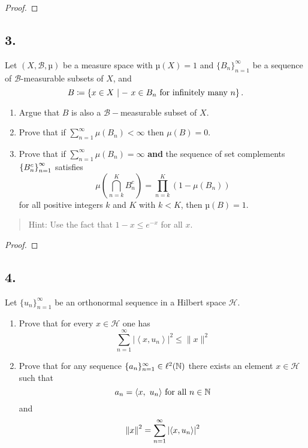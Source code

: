\begin{proof}

\end{proof}

\hypertarget{section-2}{%
\subsection{3.}\label{section-2}}

Let \((X, \mathcal B, µ)\) be a measure space with \(µ(X) = 1\) and
\(\{B_n\}_{n=1}^\infty\) be a sequence of \(\mathcal B\)-measurable
subsets of \(X\), and \[
B \coloneqq \left\{{x\in X {~\mid- ~} x\in B_n \text{ for infinitely many } n}\right\}.
\]

\begin{enumerate}
\def\labelenumi{\alph{enumi}.}
\item
  Argue that \(B\) is also a \(\mathcal{B} -\)measurable subset of
  \(X\).
\item
  Prove that if \(\sum_{n=1}^\infty \mu(B_n) < \infty\) then
  \(\mu(B)= 0\).
\item
  Prove that if \(\sum_{n=1}^\infty \mu(B_n) = \infty\) \textbf{and} the
  sequence of set complements \(\left\{{B_n^c}\right\}_{n=1}^\infty\) satisfies
  \[
  \mu\left(\bigcap_{n=k}^{K} B_{n}^{c}\right)=\prod_{n=k}^{K}\left(1-\mu\left(B_{n}\right)\right)
  \] for all positive integers \(k\) and \(K\) with \(k < K\), then
  \(µ(B) = 1\).
\end{enumerate}

\begin{quote}
Hint: Use the fact that \(1 - x \leq e^{-x}\) for all \(x\).
\end{quote}

\begin{proof}

\end{proof}

\hypertarget{section-3}{%
\subsection{4.}\label{section-3}}

Let \(\{u_n\}_{n=1}^\infty\) be an orthonormal sequence in a Hilbert space
\(\mathcal{H}\).

\begin{enumerate}
\def\labelenumi{\alph{enumi}.}
\item
  Prove that for every \(x \in \mathcal H\) one has \[
  \displaystyle\sum_{n=1}^{\infty}\left|\left\langle x, u_{n}\right\rangle\right|^{2} \leq\|x\|^{2}
  \]
\item
  Prove that for any sequence \(\{a_n\}_{n=1}^\infty \in \ell^2({\mathbb{N}})\)
  there exists an element \(x\in\mathcal H\) such that \[
    a_n = {\left\langle {x},~{u_n} \right\rangle} \text{ for all } n\in {\mathbb{N}}
    \] and \[
    {\left\lVert {x} \right\rVert}^2 = \sum_{n=1}^{\infty}\left|\left\langle x, u_{n}\right\rangle\right|^{2}
    \]
\end{enumerate}

